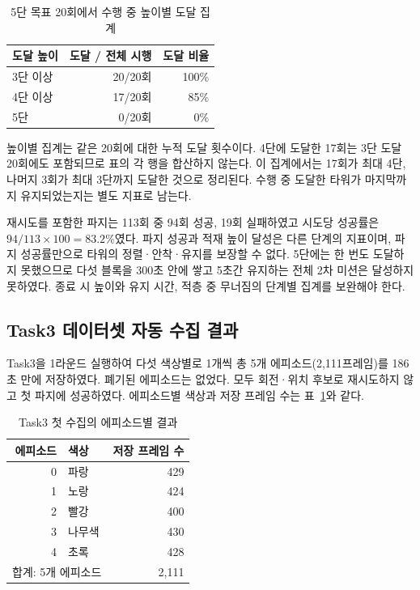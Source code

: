\begin{table}[htbp]
\centering
\caption{5단 목표 20회에서 수행 중 높이별 도달 집계}
\begin{tabular}{@{}lrr@{}}
\toprule 도달 높이 & 도달 / 전체 시행 & 도달 비율 \\
\midrule
3단 이상 & 20/20회 & 100\% \\
4단 이상 & 17/20회 & 85\% \\
5단 & 0/20회 & 0\% \\
\bottomrule
\end{tabular}
\end{table}

높이별 집계는 같은 20회에 대한 누적 도달 횟수이다. 4단에 도달한 17회는 3단 도달 20회에도 포함되므로 표의 각 행을 합산하지 않는다. 이 집계에서는 17회가 최대 4단, 나머지 3회가 최대 3단까지 도달한 것으로 정리된다. 수행 중 도달한 타워가 마지막까지 유지되었는지는 별도 지표로 남는다.

재시도를 포함한 파지는 113회 중 94회 성공, 19회 실패하였고 시도당 성공률은 $94/113\times100=83.2\%$였다. 파지 성공과 적재 높이 달성은 다른 단계의 지표이며, 파지 성공률만으로 타워의 정렬·안착·유지를 보장할 수 없다. 5단에는 한 번도 도달하지 못했으므로 다섯 블록을 300초 안에 쌓고 5초간 유지하는 전체 2차 미션은 달성하지 못하였다. 종료 시 높이와 유지 시간, 적층 중 무너짐의 단계별 집계를 보완해야 한다.

\subsection{Task3 데이터셋 자동 수집 결과}
\label{sec:task3-results}
Task3을 1라운드 실행하여 다섯 색상별로 1개씩 총 5개 에피소드(2,111프레임)를 186초 만에 저장하였다. 폐기된 에피소드는 없었다. 모두 회전·위치 후보로 재시도하지 않고 첫 파지에 성공하였다. 에피소드별 색상과 저장 프레임 수는 표~\ref{tab:task3-episodes}와 같다.

\begin{table}[htbp]
\centering
\caption{Task3 첫 수집의 에피소드별 결과}\label{tab:task3-episodes}
\begin{tabular}{@{}rlr@{}}
\toprule
에피소드 & 색상 & 저장 프레임 수 \\
\midrule
0 & 파랑 & 429 \\
1 & 노랑 & 424 \\
2 & 빨강 & 400 \\
3 & 나무색 & 430 \\
4 & 초록 & 428 \\
\midrule
\multicolumn{2}{l}{합계: 5개 에피소드} & 2{,}111 \\
\bottomrule
\end{tabular}
\end{table}

